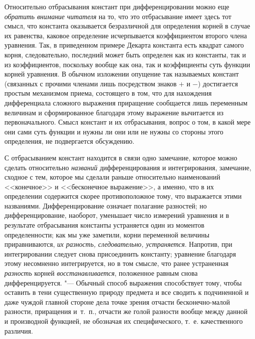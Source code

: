Относительно отбрасывания констант при дифференцировании можно еще
{\em обратить внимание читателя} на то, что это отбрасывание имеет здесь тот
смысл, что константа оказывается безразличной для определения корней в случае
их равенства, каковое определение исчерпывается коэффициентом второго члена
уравнения. Так, в приведенном примере Декарта константа есть квадрат самого
корня, следовательно, последний может быть определен как из константы, так и из
коэффициентов, поскольку вообще как она, так и коэффициенты суть функции корней
уравнения. В обычном изложении опущение так называемых констант (связанных с
прочими членами лишь посредством знаков $+$ и $-$) достигается простым
механизмом приема, состоящего в том, что для нахождения дифференциала сложного
выражения приращение сообщается лишь переменным величинам и сформированное
благодаря этому выражение вычитается из первоначального. Смысл констант и их
отбрасывания, вопрос о том, в какой мере они сами суть функции и нужны ли они
или не нужны со стороны этого определения, не подвергается обсуждению.

С отбрасыванием констант находится в связи одно замечание, которое можно
сделать относительно {\em названий} дифференцирования и интегрирования,
замечание, сходное с тем, которое мы сделали раньше относительно наименований
<<конечное>> и <<бесконечное выражение>>, а именно, что в их
определении содержится скорее противоположное тому, что выражается этими
названиями. Дифференцирование означает полагание разностей; но
дифференцирование, наоборот, уменьшает число измерений уравнения и в результате
отбрасывания константы устраняется один из моментов определенности; как мы уже
заметили, корни переменной величины приравниваются,
{\em их разность, следовательно, устраняется}. Напротив, при интегрировании
следует снова присоединить константу; уравнение благодаря этому несомненно
интегрируется, но в том смысле, что ранее устраненная {\em разность} корней
{\em восстанавливается}, положенное равным снова дифференцируется. "--- Обычный
способ выражения способствует тому, чтобы оставить в тени существенную природу
предмета и все сводить к подчиненной и даже чуждой главной стороне дела точке
зрения отчасти бесконечно-малой разности, приращения и~т.~п., отчасти же голой
разности вообще между данной и производной функцией, не обозначая их
специфического, т.~е. качественного различия.

